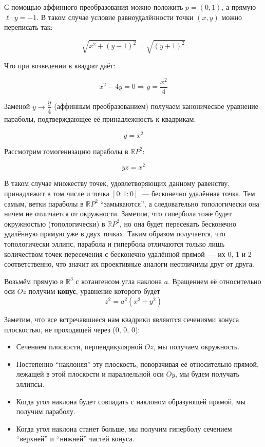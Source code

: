 \documentclass[11pt]{article}
\begin{document}
    С помощью аффинного преобразования можно положить $p = (0, 1)$, а прямую $\ell\colon y = -1$. В таком случае условие равноудалённости точки $(x, y)$ можно переписать так:

    \begin{equation*}
        \sqrt{x^2 + (y - 1)^2} = \sqrt{(y + 1)^2}
    \end{equation*}

    Что при возведении в квадрат даёт:

    \begin{equation*}
        x^2 - 4y = 0 \Longrightarrow y = \dfrac{x^2}{4}
    \end{equation*}

    Заменой $y \to \dfrac{y}{4}$ (аффинным преобразованием) получаем каноническое уравнение параболы, подтверждающее её принадлежность к квадрикам:

    \begin{equation*}
        y = x^2
    \end{equation*}

    Рассмотрим гомогенизацию параболы в $\mathbb{R}P^2$:

    \begin{equation*}
        yz = x^2
    \end{equation*}

    В таком случае множеству точек, удовлетворяющих данному равенству, принадлежит в том числе и точка $[0:1:0]$~--- бесконечно удалённая точка. Тем самым, ветки параболы в $\mathbb{R}P^2$ ``замыкаются'', а следовательно топологически она ничем не отличается от окружности. Заметим, что гипербола тоже будет окружностью (топологически) в $\mathbb{R}P^2$, но она будет пересекать бесконечно удалённую прямую уже в двух точках. Таким образом получается, что топологически эллипс, парабола и гипербола отличаются только лишь количеством точек пересечения с бесконечно удалённой прямой~--- их 0, 1 и 2 соответственно, что значит их проективные аналоги неотличимы друг от друга.


    Возьмём прямую в $\mathbb{R}^3$ с котангенсом угла наклона $a$. Вращением её относительно оси $Oz$ получим \textbf{конус}, уравнение которого будет
    \begin{equation*}
        z^2 = a^2(x^2 + y^2)
    \end{equation*}

    Заметим, что все встречавшиеся нам квадрики являются сечениями конуса плоскостью, не проходящей через (0, 0, 0):
    \begin{itemize}
        \item Сечением плоскости, перпендикулярной $Oz$, мы получаем окружность.
        \item Постепенно ``наклоняя'' эту плоскость, поворачивая её относительно прямой, лежащей в этой плоскости и параллельной оси $Oy$, мы будем получать эллипсы.
        \item Когда угол наклона будет совпадать с наклоном образующей прямой, мы получим параболу.
        \item Когда угол наклона станет больше, мы получим гиперболу сечением ``верхней'' и ``нижней'' частей конуса.
    \end{itemize}
\end{document}
